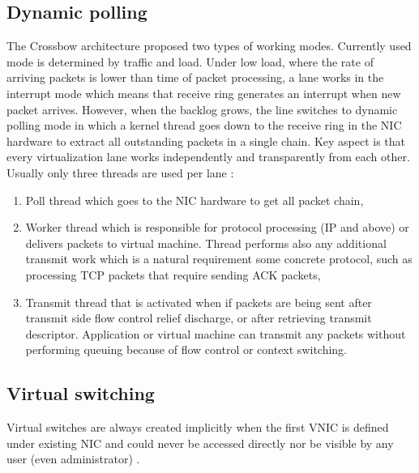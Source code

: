 \documentclass[11pt]{book}
\begin{document}
      \subsection{Dynamic polling}	
        
        The Crossbow architecture proposed two types of working modes. Currently used mode is determined by traffic and
        load. Under low load, where the rate of arriving packets is lower than time of packet processing, a lane works in
        the interrupt mode which means that receive ring generates an interrupt when new packet arrives. However, when
        the backlog grows, the line switches to dynamic polling mode in which a kernel thread goes down to the receive
        ring in the NIC hardware to extract all outstanding packets in a single chain. Key aspect is that every
        virtualization lane works independently and transparently from each other. Usually only three threads are used
        per lane \cite{crossbow}:
        
        \begin{enumerate}
          \item Poll thread which goes to the NIC hardware to get all packet chain,
          \item Worker thread which is responsible for protocol processing (IP and above) or delivers packets to virtual
                machine. Thread performs also any additional transmit work which is a natural 
                requirement some concrete protocol, such as processing TCP packets that require sending ACK packets,
          \item Transmit thread that is activated when if packets are being sent after transmit side flow control relief
                discharge, or after retrieving transmit descriptor. Application or virtual 
                machine can transmit any packets without performing queuing because of flow control or context switching.
        \end{enumerate}


      \subsection{Virtual switching}
        
        Virtual switches are always created implicitly when the first VNIC is defined under existing NIC and could never
        be accessed directly nor be visible by any user (even administrator) \cite{crossbow2}. 
        
\end{document}
